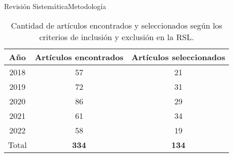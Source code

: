 \documentclass[10pt]{beamer}
\newcommand{\1}{
	\setbeamertemplate{background}{
		\texttt{[image: img/1]}
		\tikz[overlay] \fill[fill opacity=0.75,fill=white] (0,0) rectangle (-\paperwidth,\paperheight);
	}
}
\begin{document}
\begin{frame}{Revisión Sistemática}{Metodología}
	
	\begin{table}[H]
		\begin{center}
			\caption{Cantidad de artículos encontrados y seleccionados según los criterios de inclusión y exclusión en la RSL.}
			\label{tab:number_papers}
			\setlength{\tabcolsep}{0.5em} %
			{\renewcommand{\arraystretch}{1.2}%
				\begin{tabular}{ccc}
					\textbf{Año} & \textbf{Artículos encontrados} & \textbf{Artículos seleccionados}\\ \hline
					2018 & 57 & 21 \\
					2019 & 72 & 31 \\
					2020 & 86 & 29 \\
					2021 & 61 & 34 \\
					2022 & 58 & 19 \\ \hline
					Total & \textbf{334} & \textbf{134} \\
				\end{tabular}
			}
		\end{center}
	\end{table}
	
\end{frame}

\end{document}
